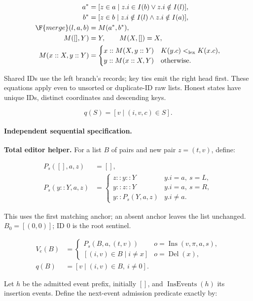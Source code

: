 \[
\begin{aligned}a^*&=[z\in a\mid z.i\in I(b)\lor z.i\notin I(l)],\\b^*&=[z\in b\mid z.i\notin I(l)\land z.i\notin I(a)],\\\F{merge}(l,a,b)&=M(a^*,b^*),\\M([],Y)&=Y,\qquad M(X,[])=X,\\M(x::X,y::Y)&=\begin{cases}x::M(X,y::Y)&K(y.c)<_{\rm lex}K(x.c),\\y::M(x::X,Y)&\text{otherwise}.\end{cases}\end{aligned}
\]


Shared IDs use the left branch's records; key ties emit the right head first. These equations apply even to unsorted or duplicate-ID raw lists. Honest states have unique IDs, distinct coordinates and descending keys.

\[
q(S)=[v\mid(i,v,c)\in S].
\]

\paragraph{Independent sequential specification.}
\textbf{Total editor helper.} For a list $B$ of pairs and new pair $z=(t,v)$, define:

\[
\begin{aligned}P_s([],a,z)&=[],\\P_s(y::Y,a,z)&=\begin{cases}z::y::Y&y.i=a,\ s=L,\\y::z::Y&y.i=a,\ s=R,\\y::P_s(Y,a,z)&y.i\ne a.\end{cases}\end{aligned}
\]


This uses the first matching anchor; an absent anchor leaves the list unchanged. $B_0=[(0,0)]$; ID $0$ is the root sentinel.

\[
\begin{aligned}V_e(B)&=\begin{cases}P_s(B,a,(t,v))&o=\operatorname{Ins}(v,\pi,a,s),\\{}[(i,v)\in B\mid i\ne x]&o=\operatorname{Del}(x),\end{cases}\\q(B)&=[v\mid(i,v)\in B,\ i\ne0].\end{aligned}
\]


Let $h$ be the admitted event prefix, initially $[]$, and $\operatorname{InsEvents}(h)$ its insertion events. Define the next-event admission predicate exactly by:

